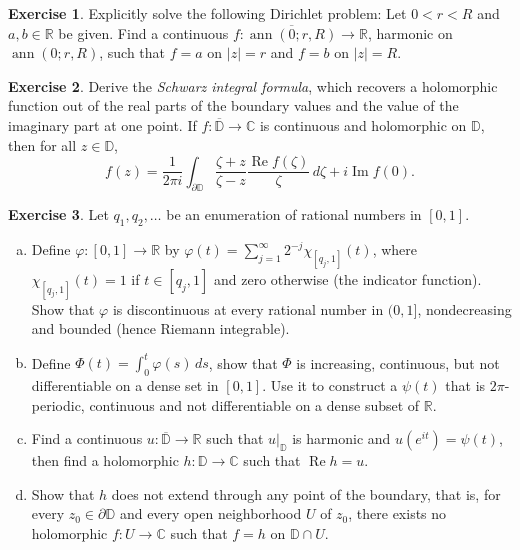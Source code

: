\documentclass[12pt,openany]{book}
\newcommand{\ann}{\operatorname{ann}}
\renewcommand{\Re}{\operatorname{Re}}
\renewcommand{\Im}{\operatorname{Im}}
\newcommand{\sabs}[1]{\lvert {#1} \rvert}
\newcommand{\C}{{\mathbb{C}}}
\newcommand{\R}{{\mathbb{R}}}
\newcommand{\D}{{\mathbb{D}}}
\newcommand{\myindex}[1]{#1\index{#1}}
\theoremstyle{plain}
\theoremstyle{remark}
\theoremstyle{definition}
\newenvironment{exbox}{%
    \def\FrameCommand{\vrule width 1pt \relax\hspace{10pt}}%
    \MakeFramed{\advance\hsize-\width\FrameRestore}%
}{%
    \endMakeFramed
}
\newenvironment{exparts}{%
    \leavevmode\begin{enumerate}[a),noitemsep,topsep=0pt,parsep=0pt,partopsep=0pt]
}{%
    \end{enumerate}
}
\theoremstyle{exercise}
\newtheorem{exercise}{Exercise}[section]
\theoremstyle{example}
\begin{document}
\begin{exbox}
\begin{exercise}
Explicitly solve the following Dirichlet problem:  Let $0 < r < R$ and $a,b
\in \R$ be given.  Find a continuous $f \colon \overline{\ann(0;r,R)} \to
\R$, harmonic on $\ann(0;r,R)$, such that $f=a$ on $\sabs{z}=r$ and $f=b$
on $\sabs{z}=R$.
\end{exercise}

\begin{exercise}
Derive the \emph{\myindex{Schwarz integral formula}}, which recovers
a holomorphic function out of the real parts of the boundary values
and the value of the imaginary part at one point.
If $f \colon \overline{\D} \to \C$ is continuous and holomorphic on
$\D$, then for all $z \in \D$,
\begin{equation*}
f(z) =
\frac{1}{2\pi i}
\int_{\partial \D}
\frac{\zeta+z}{\zeta-z} \frac{\Re f(\zeta)}{\zeta} \, d\zeta
+ i \Im f(0) .
\end{equation*}
\end{exercise}

\begin{exercise}
Let $q_1,q_2,\ldots$ be an enumeration of rational
numbers in $[0,1]$.
\begin{exparts}
\item
Define $\varphi \colon [0,1] \to {\mathbb R}$
by $\varphi(t) = \sum_{j=1}^\infty 2^{-j} \chi_{[q_j,1]}(t)$,
where $\chi_{[q_j,1]}(t) = 1$ if $t \in [q_j,1]$ and
zero otherwise (the indicator function).  Show that
$\varphi$ is discontinuous at every rational number in $(0,1]$,
nondecreasing and bounded (hence Riemann integrable).
\item
Define $\Phi(t) = \int_0^t \varphi(s)\, ds$, show that $\Phi$
is increasing, continuous, but not differentiable
on a dense set in $[0,1]$.  Use it to construct a
$\psi(t)$ that is $2\pi$-periodic, continuous and 
not differentiable on a dense subset of $\R$.
\item
Find a continuous $u \colon \overline{\D} \to \R$
such that $u|_{\D}$ is harmonic and
$u(e^{it}) = \psi(t)$, then find a holomorphic $h \colon \D \to \C$
such that $\Re h = u$.
\item
Show that $h$ does not extend through any point of
the boundary, that is, for every
$z_0 \in \partial \D$ and every open neighborhood
$U$ of $z_0$, there exists no holomorphic $f \colon U \to \C$
such that $f = h$ on $\D \cap U$.
\end{exparts}
\end{exercise}
\end{exbox}
\end{document}

